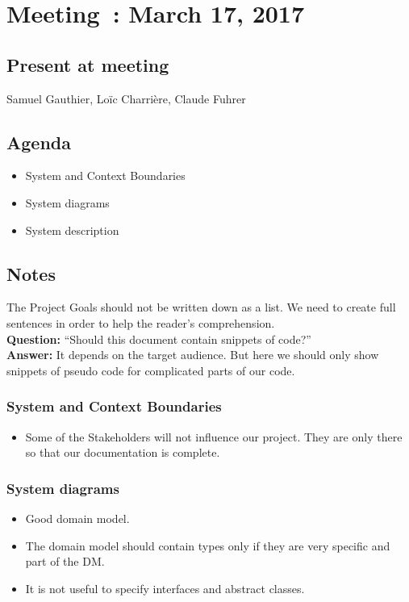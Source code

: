 \section{Meeting~: March 17, 2017}
\subsection*{Present at meeting}
Samuel Gauthier, Loïc Charrière, Claude Fuhrer
\subsection*{Agenda}
\begin{itemize}
    \item System and Context Boundaries
    \item System diagrams
    \item System description
\end{itemize}
\subsection*{Notes}
    The Project Goals should not be written down as a list. We need to create
    full sentences in order to help the reader's comprehension.\\
    \textbf{Question:} ``Should this document contain snippets of code?''\\
    \textbf{Answer:} It depends on the target audience. But here we should
    only show snippets of pseudo code for complicated parts of our code.
    \subsubsection{System and Context Boundaries}
    \begin{itemize}
        \item Some of the Stakeholders will not influence our project. They
            are only there so that our documentation is complete.
    \end{itemize}
    \subsubsection*{System diagrams}
    \begin{itemize}
        \item Good domain model.
        \item The domain model should contain types only if they
            are very specific and part of the DM\@.
        \item It is not useful to specify interfaces and abstract classes.
    \end{itemize}
